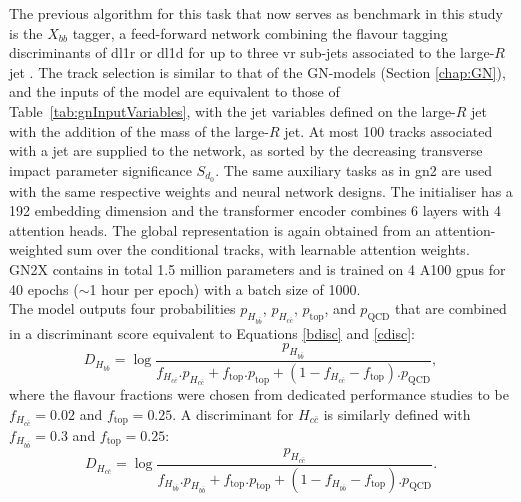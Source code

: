 The previous algorithm for this task that now serves as benchmark in this study is the $X_{bb}$ tagger, a feed-forward network combining the flavour tagging discriminants of \gls{dl1r} or \gls{dl1d} for up to three \gls{vr} sub-jets associated to the large-$R$ jet \cite{ATL-PHYS-PUB-2020-019, ATL-PHYS-PUB-2021-035}. The track selection is similar to that of the GN-models (Section \ref{chap:GN}), and the inputs of the model are equivalent to those of Table~\ref{tab:gnInputVariables}, with the jet variables defined on the large-$R$ jet with the addition of the mass of the large-$R$ jet. At most 100 tracks associated with a jet are supplied to the network, as sorted by the decreasing transverse impact parameter significance $S_{d_0}$. The same auxiliary tasks as in \gls{gn2} are used with the same respective weights and neural network designs. The initialiser has a 192 embedding dimension and the transformer encoder combines 6 layers with 4 attention heads. The global representation is again obtained from an attention-weighted sum over the conditional tracks, with learnable attention weights. GN2X contains in total 1.5 million parameters and is trained on 4 A100 \glspl{gpu} for 40 epochs ($\sim$1 hour per epoch) with a batch size of 1000. \\

The model outputs four probabilities $p_{H_{b\bar{b}}}$, $p_{H_{c\bar{c}}}$, $p_{\textrm{top}}$, and $p_{\textrm{QCD}}$ that are combined in a discriminant score equivalent to Equations \ref{bdisc} and \ref{cdisc}: 
\begin{equation}
  D_{H_{b\bar{b}}} = \log \frac{p_{H_{b\bar{b}}}}{f_{H_{c\bar{c}}} . p_{H_{c\bar{c}}} + f_{\textrm{top}} . p_{\textrm{top}} + (1 - f_{H_{c\bar{c}}} - f_{\textrm{top}}) . p_{\textrm{QCD}}},
\end{equation}
where the flavour fractions were chosen from dedicated performance studies to be $f_{H_{c\bar{c}}} = 0.02$ and $f_{\textrm{top}} = 0.25$. A discriminant for $H_{c\bar{c}}$ is similarly defined with $f_{H_{b\bar{b}}} = 0.3$ and $f_{\textrm{top}} = 0.25$:
\begin{equation}
  D_{H_{c\bar{c}}} = \log \frac{p_{H_{c\bar{c}}}}{f_{H_{b\bar{b}}} . p_{H_{b\bar{b}}} + f_{\textrm{top}} . p_{\textrm{top}} + (1 - f_{H_{b\bar{b}}} - f_{\textrm{top}}) . p_{\textrm{QCD}}}.
\end{equation}

